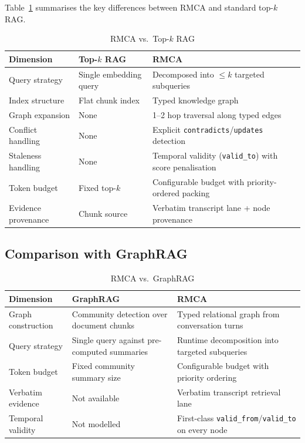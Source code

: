 \documentclass[conference]{IEEEtran}
\begin{document}
Table~\ref{tab:rag_compare} summarises the key differences between RMCA and standard
top-$k$ RAG.

\begin{table}[htbp]
\caption{RMCA vs.\ Top-$k$ RAG}
\label{tab:rag_compare}
\centering
\begin{tabular}{p{2.0cm}p{2.5cm}p{2.5cm}}
\toprule
\textbf{Dimension} & \textbf{Top-$k$ RAG} & \textbf{RMCA} \\
\midrule
Query strategy & Single embedding query & Decomposed into $\leq k$ targeted subqueries \\
Index structure & Flat chunk index & Typed knowledge graph \\
Graph expansion & None & 1--2 hop traversal along typed edges \\
Conflict handling & None & Explicit \texttt{contradicts}/\texttt{updates} detection \\
Staleness handling & None & Temporal validity (\texttt{valid\_to}) with score penalisation \\
Token budget & Fixed top-$k$ & Configurable budget with priority-ordered packing \\
Evidence provenance & Chunk source & Verbatim transcript lane + node provenance \\
\bottomrule
\end{tabular}
\end{table}

\subsection{Comparison with GraphRAG}

\begin{table}[htbp]
\caption{RMCA vs.\ GraphRAG}
\label{tab:graphrag_compare}
\centering
\begin{tabular}{p{2.0cm}p{2.5cm}p{2.5cm}}
\toprule
\textbf{Dimension} & \textbf{GraphRAG} & \textbf{RMCA} \\
\midrule
Graph construction & Community detection over document chunks & Typed relational graph from conversation turns \\
Query strategy & Single query against pre-computed summaries & Runtime decomposition into targeted subqueries \\
Token budget & Fixed community summary size & Configurable budget with priority ordering \\
Verbatim evidence & Not available & Verbatim transcript retrieval lane \\
Temporal validity & Not modelled & First-class \texttt{valid\_from}/\texttt{valid\_to} on every node \\
\bottomrule
\end{tabular}
\end{table}
\end{document}
